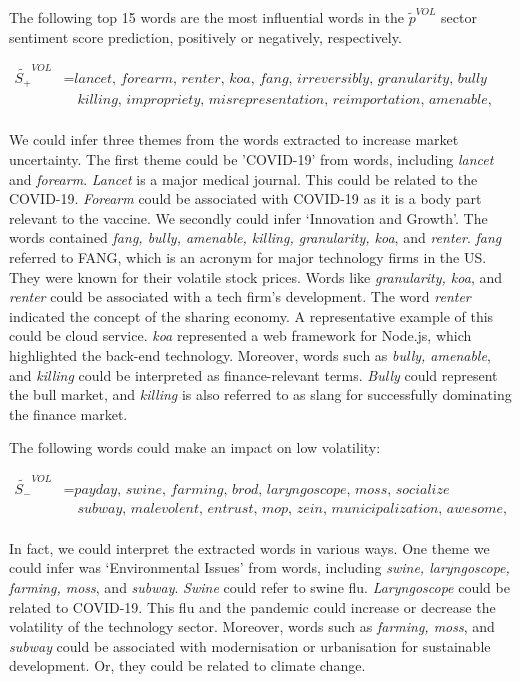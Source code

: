 \documentclass[logo,bsc,singlespacing,parskip]{infthesis}
\begin{document}
The following top 15 words are the most influential words in the $\tilde{p}^{VOL}$ sector sentiment score prediction, positively or negatively, respectively. 


\begin{align*}
\tilde{S_{+}}^{VOL} &= \textit{lancet, forearm, renter, koa, fang, irreversibly, granularity, bully} \\
               &\quad \textit{killing, impropriety, misrepresentation, reimportation, amenable, sayer, spoof} \\
\end{align*}

We could infer three themes from the words extracted to increase market uncertainty. The first theme could be 'COVID-19' from words, including \textit{lancet} and \textit{forearm}. \textit{Lancet} is a major medical journal. This could be related to the COVID-19. \textit{Forearm} could be associated with COVID-19 as it is a body part relevant to the vaccine. We secondly could infer ‘Innovation and Growth’. The words contained \textit{fang, bully, amenable, killing, granularity, koa}, and \textit{renter}. \textit{fang} referred to FANG, which is an acronym for major technology firms in the US. They were known for their volatile stock prices. Words like \textit{granularity, koa}, and \textit{renter} could be associated with a tech firm’s development. The word \textit{renter} indicated the concept of the sharing economy. A representative example of this could be cloud service. \textit{koa} represented a web framework for Node.js, which highlighted the back-end technology. Moreover, words such as \textit{bully, amenable}, and \textit{killing} could be interpreted as finance-relevant terms. \textit{Bully} could represent the bull market, and \textit{killing} is also referred to as slang for successfully dominating the finance market.

The following words could make an impact on low volatility:

\begin{align*}
\tilde{S_{-}}^{VOL} &= \textit{payday, swine, farming, brod, laryngoscope, moss, socialize} \\
               &\quad \textit{subway, malevolent, entrust, mop, zein, municipalization, awesome, roller} \\
\end{align*}

In fact, we could interpret the extracted words in various ways. One theme we could infer was ‘Environmental Issues’ from words, including \textit{swine, laryngoscope, farming, moss}, and \textit{subway}. \textit{Swine} could refer to swine flu. \textit{Laryngoscope} could be related to COVID-19. This flu and the pandemic could increase or decrease the volatility of the technology sector. Moreover, words such as \textit{farming, moss}, and \textit{subway} could be associated with modernisation or urbanisation for sustainable development. Or, they could be related to climate change.
\end{document}
